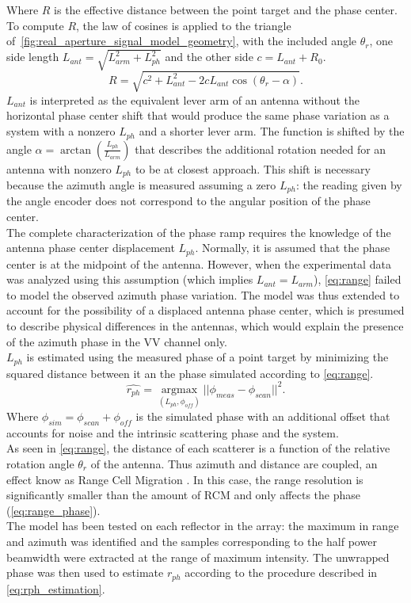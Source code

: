 Where $R$ is the effective distance between the point target and the phase center.
To compute $R$, the law of cosines is applied to the triangle of~\autoref{fig:real_aperture_signal_model_geometry}, with the included angle $\theta_r$, one side length $L_{ant} = \sqrt{L_{arm}^2 + L_{ph}^2}$ and the other side $c = L_{ant} + R_0$.
\begin{equation}\label{eq:range}
	R = \sqrt{ c^2 +  L_{ant}^2 - 2 c L_{ant} \cos{\left(\theta_r - \alpha\right)}}.
\end{equation}
$L_{ant}$ is interpreted as the equivalent lever arm of an antenna without the horizontal phase center shift that would produce the same phase variation as a system with a nonzero $L_{ph}$ and a shorter lever arm.
The function is shifted by the angle  $\alpha = \operatorname{\arctan}\left({\frac{L_{ph}}{L_{arm}}}\right)$ that describes the additional rotation needed for an antenna with nonzero $L_{ph}$ to be at closest approach. This shift is necessary because the azimuth angle is measured assuming a zero $L_{ph}$: the reading given by the angle encoder does not correspond to the angular position of the phase center.\\
The complete characterization of the phase ramp requires the knowledge of the antenna phase center displacement $L_{ph}$. Normally, it is assumed that the phase center is at the midpoint of the antenna. However, when the experimental data was analyzed using this assumption (which implies $L_{ant} = L_{arm}$),  \autoref{eq:range} failed to model the observed azimuth phase variation. The model was thus extended to account for the possibility of a displaced antenna phase center, which is presumed to describe physical differences in the antennas, which would explain the presence of the azimuth phase in the VV channel only.\\ $L_{ph}$ is estimated using the measured phase of a point target by minimizing the squared distance between it an the phase simulated according to \autoref{eq:range}.
\begin{equation}\label{eq:rph_estimation}
	\hat{r_{ph}} = \underset{\left(L_{ph}, \phi_{off}\right)}{\operatorname{argmax}}{\vert\vert\phi_{meas} - \phi_{scan}\vert\vert}^2.
\end{equation}
Where $\phi_{sim} = \phi_{scan} + \phi_{off}$ is the simulated phase with an additional offset that accounts for noise and the intrinsic scattering phase and the system.\\
As seen in \autoref{eq:range}, the distance of each scatterer is a function of the relative rotation angle $\theta_r$ of the antenna. Thus azimuth and distance are coupled, an effect know as Range Cell Migration . In this case, the range resolution is significantly smaller than the amount of RCM and only affects the phase (\autoref{eq:range_phase}).\\
The model has been tested on each reflector in the array: the maximum in range and azimuth was identified and the samples corresponding to the half power beamwidth were extracted at the range of maximum intensity. The unwrapped phase was then used to estimate $r_{ph}$ according to the procedure described in \autoref{eq:rph_estimation}.



